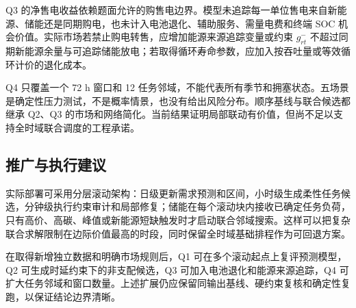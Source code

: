Q3 的净售电收益依赖题面允许的购售电边界。模型未追踪每一单位售电来自新能源、储能还是同期购电，也未计入电池退化、辅助服务、需量电费和终端 SOC 机会价值。实际市场若禁止购电转售，应增加能源来源追踪变量或约束 $g^-_{rt}$ 不超过同期新能源余量与可追踪储能放电；若取得循环寿命参数，应加入按吞吐量或等效循环计价的退化成本。

Q4 只覆盖一个 72 h 窗口和 12 任务邻域，不能代表所有季节和拥塞状态。五场景是确定性压力测试，不是概率情景，也没有给出风险分布。顺序基线与联合候选都继承 Q2、Q3 的市场和网络简化。当前结果证明局部联动有价值，但尚不足以支持全时域联合调度的工程承诺。

\subsection{推广与执行建议}

实际部署可采用分层滚动架构：日级更新需求预测和区间，小时级生成柔性任务候选，分钟级执行约束审计和局部修复；储能在每个滚动块内接收已确定任务负荷，只有高价、高碳、峰值或新能源短缺触发时才启动联合邻域搜索。这样可以把复杂联合求解限制在边际价值最高的时段，同时保留全时域基础排程作为可回退方案。

在取得新增独立数据和明确市场规则后，Q1 可在多个滚动起点上复评预测模型，Q2 可生成时延约束下的非支配候选，Q3 可加入电池退化和能源来源追踪，Q4 可扩大任务邻域和窗口数量。上述扩展仍应保留同输出基线、硬约束复核和确定性复跑，以保证结论边界清晰。
